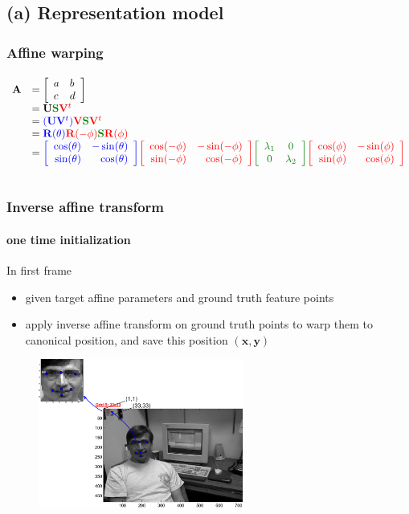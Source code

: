 \subsection{(a) Representation model}
\begin{frame}[plain]
\frametitle{Affine warping}
\framesubtitle{}
\logoCSIPCPL\mypagenum
\scriptsize
\begin{changemargin}{-1.3in}{0in}
\begin{equation*}
\begin{array}{llllllll}
\mathbf{A} &= \left[\begin{array}{lll}a & b \\ c & d\\ \end{array}\right] \\
&=\mathbf{U}{\color{darkgreen}\mathbf{S}}{\color{red}\mathbf{V}^t} \\
&={\color{blue}(\mathbf{U}\mathbf{V}^t)}{\color{red}\mathbf{V}}{\color{darkgreen}\mathbf{S}}{\color{red}\mathbf{V}^t}\\
&={\color{blue}\mathbf{R}(\theta)}{\color{red}\mathbf{R}(-\phi)}{\color{darkgreen}\mathbf{S}}{\color{red}\mathbf{R} (\phi)}\\
&={\color{blue}\RotMatrixTheta}{\color{red}\RotMatrixminusPhi}{\color{darkgreen}\EigenvalueMatrix}{\color{red}\RotMatrixPhi}\\\\
\end{array}
\label{Eq:AffineDecomposition}
\end{equation*}
\end{changemargin}
\end{frame}



\begin{frame}
\frametitle{Inverse affine transform}
\framesubtitle{one time initialization}
\logoCSIPCPL\mypagenum
In first frame
\begin{itemize}
\item given target affine parameters and ground truth feature points
\item apply inverse affine transform on ground truth points to warp them to canonical position, and save this position $(\mathbf{x, y})$
\end{itemize}
\begin{figure}[t]
\centering
\includegraphics[width=0.6\textwidth]{thesis/dataset_Dudek_00001_inverseAffine.pdf}
\label{fig:original_feature_points}
\end{figure}
\end{frame}




